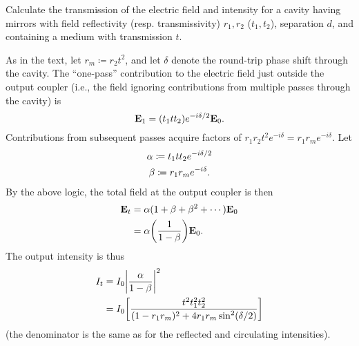 \documentclass{article}
\newcounter{problem}
\numberwithin{equation}{problem}
\newcommand{\tx}[1]{\textnormal{#1}}
\theoremstyle{definition}
\theoremstyle{remark}
\begin{document}
\begin{problem}[Problem 2][Nagourney 3.2] \label{3.2}

\begin{problemstatement}
Calculate the transmission of the electric field and intensity for a cavity having mirrors with field reflectivity (resp. transmissivity) $r_1, r_2$ ($t_1, t_2$), separation $d$, and containing a medium with transmission $t$.
\end{problemstatement}

As in the text, let $r_m \coloneqq r_2 t^2$, and let $\delta$ denote the round-trip phase shift through the cavity.  The ``one-pass'' contribution to the electric field just outside the output coupler (i.e., the field ignoring contributions from multiple passes through the cavity) is
\[
\vb{E}_1 = (t_1 t t_2) e^{-i \delta / 2} \vb{E}_0 \tx{.}
\]
Contributions from subsequent passes acquire factors of $r_1 r_2 t^2 e^{-i \delta} = r_1 r_m e^{-i \delta}$.  Let
\begin{gather*}
\alpha \coloneqq t_1 t t_2 e^{-i \delta / 2} \\
\beta \coloneqq r_1 r_m e^{-i \delta} \tx{.}
\end{gather*}
By the above logic, the total field at the output coupler is then
\begin{align*}
\vb{E}_t &= \alpha (1 + \beta + \beta^2 + \cdots) \vb{E}_0 \\
&= \alpha \qty( \frac{1}{1 - \beta} ) \vb{E}_0 \tx{.}
\end{align*}
The output intensity is thus
\begin{align*}
I_t &= I_0 \qty| \frac{\alpha}{1 - \beta} |^2 \\
&= I_0 \qty[ \frac{t^2 t_1^2 t_2^2}{(1 - r_1 r_m)^2 + 4 r_1 r_m \sin^2 (\delta / 2)} ]
\end{align*}
(the denominator is the same as for the reflected and circulating intensities).

\end{problem}
\end{document}
